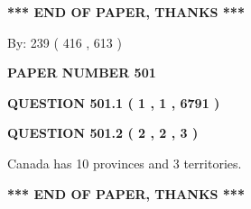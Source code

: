\documentclass[12pt]{article}
\begin{document}
 
 
 
   
   
 \vspace{0.2in}
 
   
   
   
   
\vspace{1.0in} 
{\textbf{\large{ *** END OF PAPER, THANKS *** }}} 
   
   
\hspace{1.0in} By: 
 239 ( 416 ,  613 )
   
   
   
   
\newpage 
\setcounter{page}{ 
   501001 } 
   
   
   
   
 {\textbf{ \Large{ PAPER NUMBER  501  }}}
   
   
\vspace{0.2in}
   
   
   
   
   
   
 \vspace{0.2in}
 
 
 
 
   
   
  
\vspace{0.2in}
  
{\textbf{\Large{QUESTION
501.1 
 ( 1 , 1 , 6791 )
}}}
  
  
  
\vspace{0.2in}
  
{\textbf{\Large{QUESTION
501.2 
 ( 2 , 2 , 3 )
}}}
  
  
 
 
\noindent{}
 
 
Canada has 10  provinces and 3 territories.
 
 
 
 
   
   
 \vspace{0.2in}
 
   
   
   
   
\vspace{1.0in} 
{\textbf{\large{ *** END OF PAPER, THANKS *** }}} 
   
\end{document}
